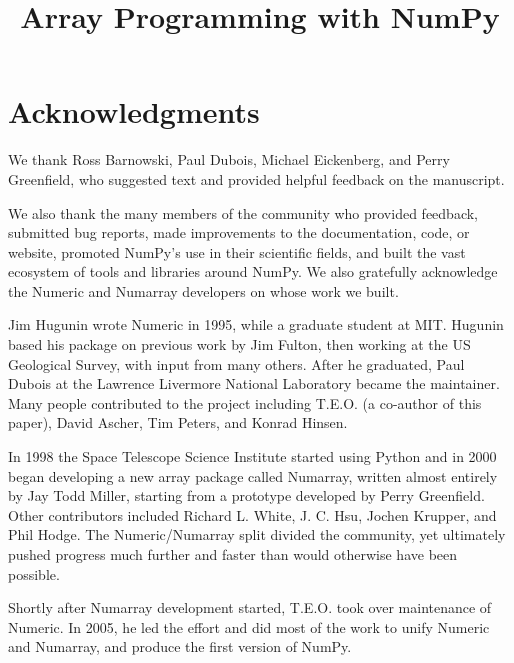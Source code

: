 \documentclass[twocolumn]{article}
\title{Array Programming with NumPy}
\begin{document}
\flushbottom
\maketitle
\thispagestyle{empty}

\twocolumn[
  \begin{@twocolumnfalse}
    \begin{abstract}
     
    \end{abstract}
    \vspace{1cm}
  \end{@twocolumnfalse}
]








\section*{Acknowledgments}

We thank Ross Barnowski, Paul Dubois, Michael Eickenberg, and Perry Greenfield, who
suggested text and provided helpful feedback on the manuscript.

We also thank the many members of the community who provided
feedback, submitted bug reports, made improvements to the documentation,
code, or website, promoted NumPy's use in their scientific fields, and built
the vast ecosystem of tools and libraries around NumPy.
We also gratefully acknowledge the Numeric and Numarray developers
on whose work we built.  

Jim Hugunin wrote Numeric in 1995, while a graduate student at MIT.
Hugunin based his package on previous work by Jim Fulton, then working at the
US Geological Survey, with input from many others.
After he graduated, Paul Dubois at the Lawrence Livermore National Laboratory
became the maintainer.
Many people contributed to the project including T.E.O. (a co-author
of this paper), David Ascher, Tim Peters, and Konrad Hinsen.

In 1998 the Space Telescope Science Institute started using Python
and in 2000 began developing a new array package called Numarray, written
almost entirely by Jay Todd Miller, starting from a prototype developed by
Perry Greenfield.  Other contributors included Richard L. White, J. C. Hsu,
Jochen Krupper, and Phil Hodge.
The Numeric/Numarray split divided the community, yet ultimately pushed
progress much further and faster than would otherwise have been possible. 

Shortly after Numarray development started, T.E.O. took over maintenance of
Numeric. In 2005, he led the effort and did most of the work to unify Numeric
and Numarray, and produce the first version of NumPy.
\end{document}
